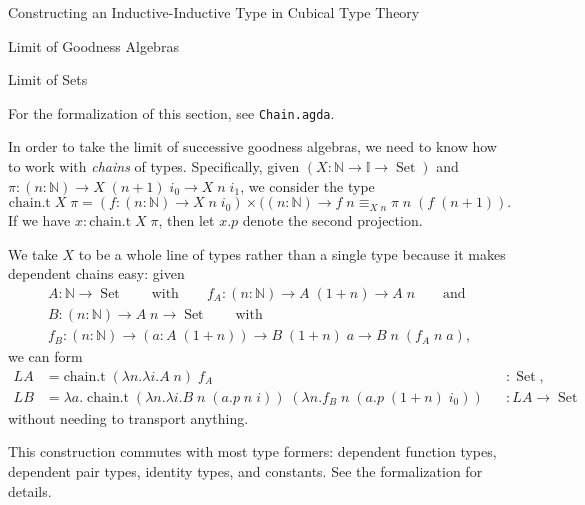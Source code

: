 \documentclass[runningheads]{llncs}
\DeclareMathOperator{\USet}{Set}
\newcommand{\IdA}[3]{{#1}\equiv_{#3}{#2}}
\newcommand{\N}{\mathbb{N}}
\newcommand{\II}{\mathbb{I}}
\begin{document}
\begin{section}{Constructing an Inductive-Inductive Type in Cubical Type Theory}
\begin{subsection}{Limit of Goodness Algebras}
\begin{subsubsection}{Limit of Sets}
    
    For the formalization of this section, see \texttt{Chain.agda}.
    
    In order to take the limit of successive goodness algebras, we need to know how to work with \emph{chains} of types. Specifically, given $(X : \N \to \II \to \USet)$ and $\pi : (n : \N) \to X\;(n+1)\;i_0 \to X\;n\;i_1$, we consider the type \[\text{chain.t}\;X\;\pi = (f : (n : \N) \to X\;n\;i_0)\times((n : \N) \to \IdA{f\;n}{\pi\;n\;(f\;(n+1))}{X\;n}.\] If we have $x : \text{chain.t}\;X\;\pi$, then let $x.p$ denote the second projection.
    
    We take $X$ to be a whole line of types rather than a single type because it makes dependent chains easy: given \begin{gather*}A : \N\to \USet\qquad\text{with}\qquad f_A : (n : \N) \to A\;(1+n) \to A\;n\qquad \text{and}\\B : (n : \N) \to A\;n \to \USet\qquad\text{with}\\f_B : (n : \N) \to (a : A\;(1+n)) \to B\;(1+n)\;a \to B\;n\;(f_A\;n\;a),\end{gather*} we can form \begin{align*}LA &= \text{chain.t}\;(\lambda n.\lambda i. A\;n)\;f_A &&: \USet,\\LB &= \lambda a.\;\text{chain.t}\;(\lambda n.\lambda i. B\;n\;(a.p\;n\;i))\;(\lambda n. f_B\;n\;(a.p\;(1+n)\;i_0)) &&: LA \to \USet\end{align*} without needing to transport anything.
    
    This construction commutes with most type formers: dependent function types, dependent pair types, identity types, and constants. See the formalization for details.
    

\end{subsubsection}
\end{subsection}
\end{section}
\end{document}
